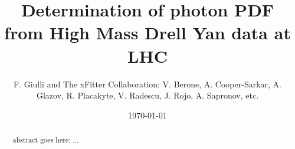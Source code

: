 \documentclass[twocolumn,english,aps]{revtex4-1}
\begin{document}
\title{Determination of photon PDF from High Mass Drell Yan data at LHC}


\author{F. Giulli and The xFitter Collaboration: V. Berone, A. Cooper-Sarkar, A. Glazov, R. Placakyte, V. Radescu,  J. Rojo, A. Sapronov, etc. }


\date{\today}
\begin{abstract}
abstract goes here: ...
\end{abstract}
\maketitle
\tableofcontents{}













\end{document}
